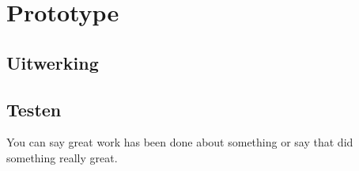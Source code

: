 \chapter{Prototype}

\section{Uitwerking}

\section{Testen}

You can say great work has been done about something \citep{Castleman98,Granlund95} or say that \citet{Holmes95} did something really great.